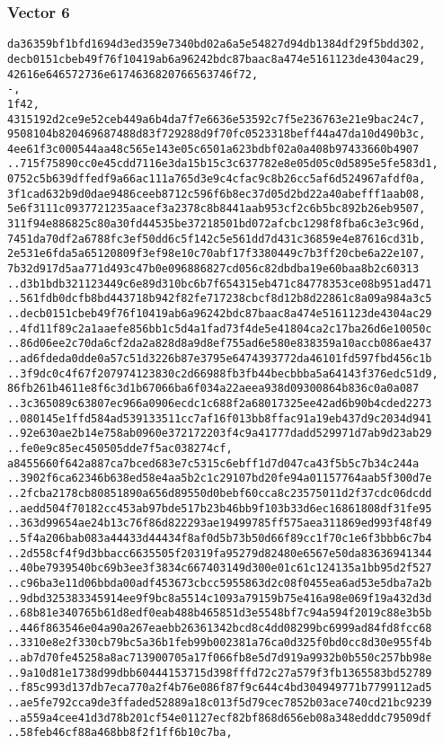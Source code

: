 \documentclass[
]{article}
\begin{document}
\hypertarget{vector-6-2}{%
\subsubsection{Vector 6}\label{vector-6-2}}

\begin{verbatim}
da36359bf1bfd1694d3ed359e7340bd02a6a5e54827d94db1384df29f5bdd302,
decb0151cbeb49f76f10419ab6a96242bdc87baac8a474e5161123de4304ac29,
42616e646572736e6174636820766563746f72,
-,
1f42,
4315192d2ce9e52ceb449a6b4da7f7e6636e53592c7f5e236763e21e9bac24c7,
9508104b820469687488d83f729288d9f70fc0523318beff44a47da10d490b3c,
4ee61f3c000544aa48c565e143e05c6501a623bdbf02a0a408b97433660b4907
..715f75890cc0e45cdd7116e3da15b15c3c637782e8e05d05c0d5895e5fe583d1,
0752c5b639dffedf9a66ac111a765d3e9c4cfac9c8b26cc5af6d524967afdf0a,
3f1cad632b9d0dae9486ceeb8712c596f6b8ec37d05d2bd22a40abefff1aab08,
5e6f3111c0937721235aacef3a2378c8b8441aab953cf2c6b5bc892b26eb9507,
311f94e886825c80a30fd44535be37218501bd072afcbc1298f8fba6c3e3c96d,
7451da70df2a6788fc3ef50dd6c5f142c5e561dd7d431c36859e4e87616cd31b,
2e531e6fda5a65120809f3ef98e10c70abf17f3380449c7b3ff20cbe6a22e107,
7b32d917d5aa771d493c47b0e096886827cd056c82dbdba19e60baa8b2c60313
..d3b1bdb321123449c6e89d310bc6b7f654315eb471c84778353ce08b951ad471
..561fdb0dcfb8bd443718b942f82fe717238cbcf8d12b8d22861c8a09a984a3c5
..decb0151cbeb49f76f10419ab6a96242bdc87baac8a474e5161123de4304ac29
..4fd11f89c2a1aaefe856bb1c5d4a1fad73f4de5e41804ca2c17ba26d6e10050c
..86d06ee2c70da6cf2da2a828d8a9d8ef755ad6e580e838359a10accb086ae437
..ad6fdeda0dde0a57c51d3226b87e3795e6474393772da46101fd597fbd456c1b
..3f9dc0c4f67f207974123830c2d66988fb3fb44becbbba5a64143f376edc51d9,
86fb261b4611e8f6c3d1b67066ba6f034a22aeea938d09300864b836c0a0a087
..3c365089c63807ec966a0906ecdc1c688f2a68017325ee42ad6b90b4cded2273
..080145e1ffd584ad539133511cc7af16f013bb8ffac91a19eb437d9c2034d941
..92e630ae2b14e758ab0960e372172203f4c9a41777dadd529971d7ab9d23ab29
..fe0e9c85ec450505dde7f5ac038274cf,
a8455660f642a887ca7bced683e7c5315c6ebff1d7d047ca43f5b5c7b34c244a
..3902f6ca62346b638ed58e4aa5b2c1c29107bd20fe94a01157764aab5f300d7e
..2fcba2178cb80851890a656d89550d0bebf60cca8c23575011d2f37cdc06dcdd
..aedd504f70182cc453ab97bde517b23b46bb9f103b33d6ec16861808df31fe95
..363d99654ae24b13c76f86d822293ae19499785ff575aea311869ed993f48f49
..5f4a206bab083a44433d44434f8af0d5b73b50d66f89cc1f70c1e6f3bbb6c7b4
..2d558cf4f9d3bbacc6635505f20319fa95279d82480e6567e50da83636941344
..40be7939540bc69b3ee3f3834c667403149d300e01c61c124135a1bb95d2f527
..c96ba3e11d06bbda00adf453673cbcc5955863d2c08f0455ea6ad53e5dba7a2b
..9dbd325383345914ee9f9bc8a5514c1093a79159b75e416a98e069f19a432d3d
..68b81e340765b61d8edf0eab488b465851d3e5548bf7c94a594f2019c88e3b5b
..446f863546e04a90a267eaebb26361342bcd8c4dd08299bc6999ad84fd8fcc68
..3310e8e2f330cb79bc5a36b1feb99b002381a76ca0d325f0bd0cc8d30e955f4b
..ab7d70fe45258a8ac713900705a17f066fb8e5d7d919a9932b0b550c257bb98e
..9a10d81e1738d99dbb60444153715d398fffd72c27a579f3fb1365583bd52789
..f85c993d137db7eca770a2f4b76e086f87f9c644c4bd304949771b7799112ad5
..ae5fe792cca9de3ffaded52889a18c013f5d79cec7852b03ace740cd21bc9239
..a559a4cee41d3d78b201cf54e01127ecf82bf868d656eb08a348edddc79509df
..58feb46cf88a468bb8f2f1ff6b10c7ba,
\end{verbatim}
\end{document}
